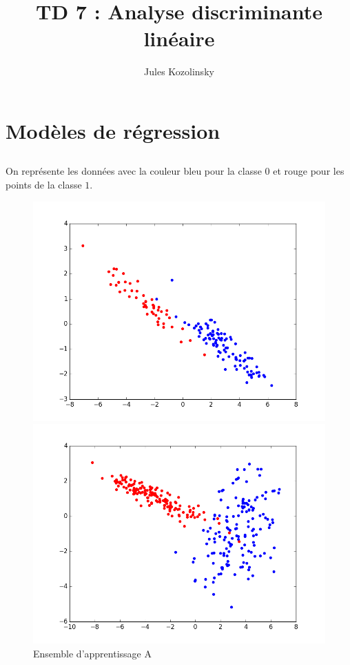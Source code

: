 \documentclass[paper=a4, fontsize=11pt]{article}
\title{\normalfont \normalsize 
\huge TD 7 : Analyse discriminante linéaire}
\author{Jules Kozolinsky}
\date{}
\begin{document}
\maketitle
\section*{Modèles de régression}
\subsection{}
On représente les données avec la couleur bleu pour la classe $0$ et rouge pour les points de la classe $1$.
\begin{figure}[h]
 \begin{minipage}[b]{.3\linewidth}
 \begin{center}
 \includegraphics[scale=0.25]{figures/A_train.png}
  \caption*{Ensemble d'apprentissage A}
 \end{center}
 \end{minipage} \hfill
 \begin{minipage}[b]{.3\linewidth}
  \includegraphics[scale=0.25]{figures/B_train.png}

\end{minipage}
\end{figure}
\end{document}
